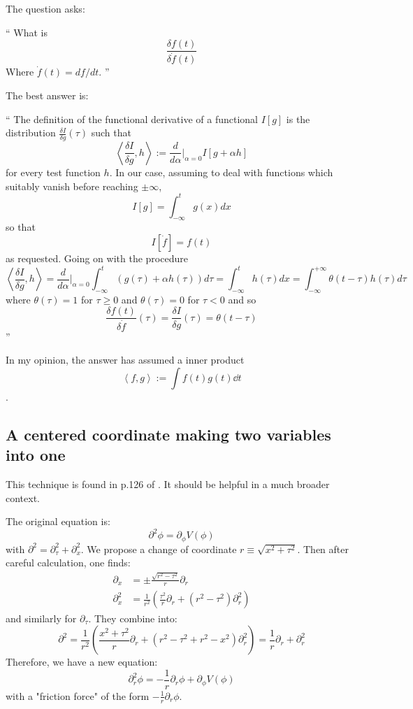 The question asks:
\begin{myquote} \enquote{
    What is 
    $$ \frac{\delta f(t)}{\delta \dot{f}(t)} $$
    Where $\dot{f}(t)=df/dt$.
} \end{myquote}

The best answer is:
\begin{myquote} \enquote{
    The definition of the functional derivative of a functional $I[g]$ is the
    distribution $\frac{\delta I}{\delta g}(\tau)$ such that 
    $$\left\langle \frac{\delta I}{\delta g}, h\right\rangle 
        := \frac{d}{d\alpha}\bigg\rvert_{\alpha=0} I[g+ \alpha h]$$
    for every test function $h$. In our case, assuming to deal with functions which
    suitably vanish before reaching $\pm \infty$,
    $$I[g] = \int_{-\infty}^t g(x)dx$$
    so that
    $$I[\dot{f}]= f(t)$$
    as requested. Going on with the procedure
    $$\left\langle \frac{\delta I}{\delta g}, h\right\rangle 
        = \frac{d}{d\alpha}|_{\alpha=0}  \int_{-\infty}^t(g(\tau)+ \alpha h(\tau)) d\tau 
        = \int_{-\infty}^t h(\tau) dx 
        = \int_{-\infty}^{+\infty} \theta(t-\tau)h(\tau) d\tau
    $$
    where $\theta(\tau)=1$ for $\tau\geq 0$ and $\theta(\tau)=0$ for $\tau<0$
    and so 
$$\frac{\delta f(t)}{\delta \dot{f}}(\tau) = \frac{\delta I}{\delta g}(\tau)= \theta(t-\tau)$$
} \end{myquote}
In my opinion, the answer has assumed a inner product 
$$\left\langle f,g \right\rangle := \int f(t)g(t)\dd{t}$$.

\subsection{A centered coordinate making two variables into one}

This technique is found in p.126 of \cite{Altland2010}. It should be helpful in
a much broader context.

The original equation is:
\begin{equation}
    \partial^2 \phi = \partial_\phi V(\phi)
\end{equation}
with $\partial^2 = \partial^2_\tau + \partial^2_x$. We propose a change of
coordinate $r\equiv \sqrt{x^2+\tau^2}$. Then after careful calculation, one
finds:
\begin{align*}
    \partial_x &= \pm\frac{\sqrt{r^2-\tau^2}}{r}\partial_r \\
    \partial^2_x &= 
        \frac{1}{r^2}\left(\frac{\tau^2}{r}\partial_r +
        (r^2-\tau^2)\partial^2_r\right) 
\end{align*}
and similarly for $\partial_\tau$. They combine into:
\begin{equation}
    \partial^2 = 
        \frac{1}{r^2}\left(\frac{x^2+\tau^2}{r}\partial_r +
        (r^2-\tau^2+r^2-x^2)\partial^2_r\right)
    = \frac{1}{r}\partial_r + \partial^2_r
\end{equation}
Therefore, we have a new equation:
\begin{equation}
    \partial^2_r \phi = - \frac{1}{r}\partial_r\phi + \partial_\phi V(\phi)
\end{equation}
with a "friction force" of the form $-\frac{1}{r}\partial_r\phi$.
